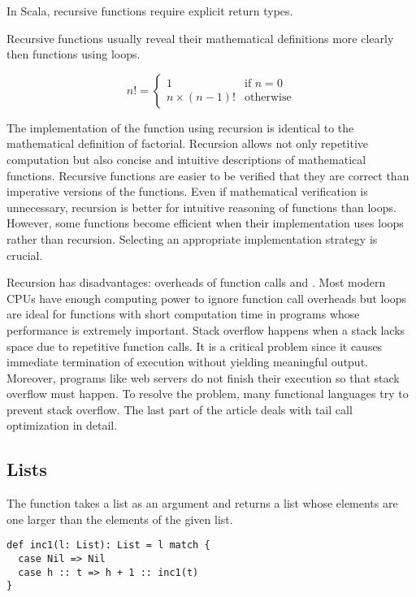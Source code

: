 In Scala, recursive functions require explicit return types.

Recursive functions usually reveal their mathematical definitions more clearly
then functions using loops.

\[n!=\begin{cases}1 & \text{if } n=0\\n \times (n-1)! &
\text{otherwise}\end{cases}\]

The implementation of the  function using recursion is identical
to the mathematical definition of factorial. Recursion allows not only repetitive
computation but also concise and intuitive descriptions of mathematical
functions. Recursive functions are easier to be verified that they are correct
than imperative versions of the functions. Even if mathematical verification is
unnecessary, recursion is better for intuitive reasoning of functions than loops.
However, some functions become efficient when their implementation uses loops
rather than recursion. Selecting an appropriate implementation strategy is
crucial.

Recursion has disadvantages: overheads of function calls and . Most modern CPUs have enough computing power to ignore function call
overheads but loops are ideal for functions with short computation time in
programs whose performance is extremely important. Stack overflow happens when a
stack lacks space due to repetitive function calls. It is a critical problem
since it causes immediate termination of execution without yielding meaningful
output. Moreover, programs like web servers do not finish their execution so that
stack overflow must happen. To resolve the problem, many functional languages try
 to prevent stack overflow. The last part of the
article deals with tail call optimization in detail.

\subsection{Lists}

The  function takes a list as an argument and returns a list whose
elements are one larger than the elements of the given list.

\begin{verbatim}
def inc1(l: List): List = l match {
  case Nil => Nil
  case h :: t => h + 1 :: inc1(t)
}
\end{verbatim}

